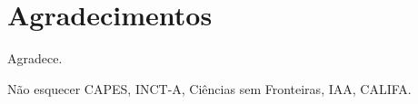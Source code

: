 


\chapter*{Agradecimentos}

Agradece.

Não esquecer CAPES, INCT-A, Ciências sem Fronteiras, IAA, CALIFA.

